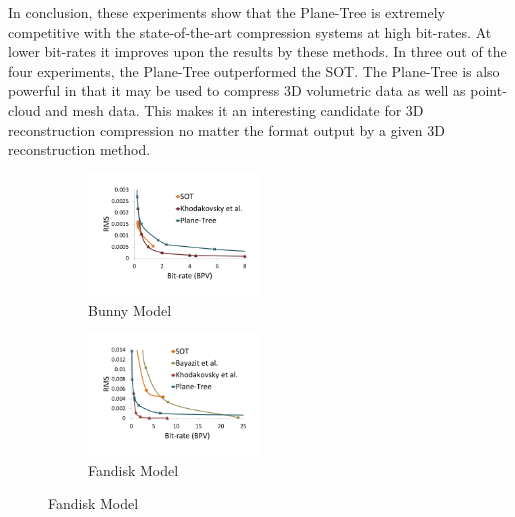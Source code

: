 In conclusion, these experiments show that the Plane-Tree is extremely competitive with the state-of-the-art compression systems at high bit-rates. At lower bit-rates it improves upon the results by these methods. In three out of the four experiments, the Plane-Tree outperformed the SOT. The Plane-Tree is also powerful in that it may be used to compress 3D volumetric data as well as point-cloud and mesh data. This makes it an interesting candidate for 3D reconstruction compression no matter the format output by a given 3D reconstruction method. \\

\begin{figure}[!htb] 
        \centering
        \begin{subfigure}[b]{1.8in}
                \includegraphics[width=1.8in]{images/results/compression/bunnysota}
                \caption{Bunny Model}
                \label{fig:SA_BUNNY}
        \end{subfigure}%
        \begin{subfigure}[b]{1.8in}
                \includegraphics[width=1.8in]{images/results/compression/fandisksota}
                \caption{Fandisk Model}
                \label{fig:SA_FANDISK}
        \end{subfigure}
        

\end{figure}
